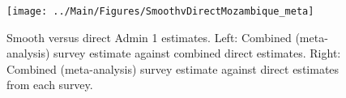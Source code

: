 \documentclass[12pt]{article}\usepackage[]{graphicx}\usepackage[]{color}
\newenvironment{knitrout}{}{} %
\begin{document}



\begin{knitrout}
\color{fgcolor}\begin{figure}[bht]

{\centering \texttt{[image: ../Main/Figures/SmoothvDirectMozambique\_meta]} 

}

\caption[Smooth versus direct Admin 1 estimates]{Smooth versus direct Admin 1 estimates. Left: Combined (meta-analysis) survey estimate against combined direct estimates. Right: Combined (meta-analysis) survey estimate against direct estimates from each survey.}\label{fig:unnamed-chunk-233}
\end{figure}


\end{knitrout}
\end{document}

